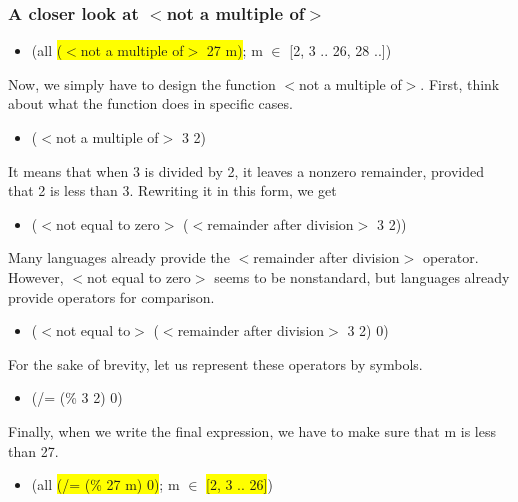 \frame
{
  \frametitle{A closer look at $<$not a multiple of$>$}
  \begin{itemize}
    \item[] (all \colorbox{yellow}{($<$not a multiple of$>$ 27 m)}; m $\in$ [2, 3 .. 26, 28 ..])
  \end{itemize}
  Now, we simply have to design the function $<$not a multiple of$>$. First, think about what the function does in specific cases.
  \begin{itemize}
    \item[] ($<$not a multiple of$>$ 3 2)
  \end{itemize}
  It means that when 3 is divided by 2, it leaves a nonzero remainder, provided that 2 is less than 3. Rewriting it in this form, we get
  \begin{itemize}
    \item[] ($<$not equal to zero$>$ ($<$remainder after division$>$ 3 2))
  \end{itemize}
  Many languages already provide the $<$remainder after division$>$ operator. However, $<$not equal to zero$>$ seems to be nonstandard, but languages already provide operators for comparison.
  \begin{itemize}
    \item[] ($<$not equal to$>$ ($<$remainder after division$>$ 3 2) 0)
  \end{itemize}
  For the sake of brevity, let us represent these operators by symbols.
  \begin{itemize}
    \item[] (/= (\% 3 2) 0)
  \end{itemize}
  Finally, when we write the final expression, we have to make sure that m is less than 27.
  \begin{itemize}
    \item[] (all \colorbox{yellow}{(/= (\% 27 m) 0)}; m $\in$ \colorbox{yellow}{[2, 3 .. 26]})
  \end{itemize}
}
